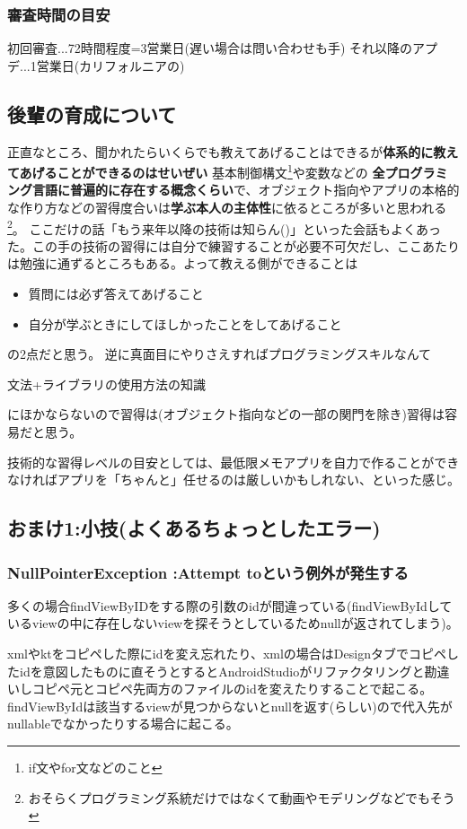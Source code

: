 \documentclass[dvipdfmx,jb5]{jarticle}
\begin{document}
\subsubsection{審査時間の目安}
初回審査...72時間程度=3営業日(遅い場合は問い合わせも手)
それ以降のアプデ...1営業日(カリフォルニアの)
\subsection{後輩の育成について}
正直なところ、聞かれたらいくらでも教えてあげることはできるが\textbf{\gtfamily 体系的に教えてあげることができるのはせいぜい} 基本制御構文\footnote{if文やfor文などのこと}や変数などの
\textbf{\gtfamily 全プログラミング言語に普遍的に存在する概念くらい}で、オブジェクト指向やアプリの本格的な作り方などの習得度合いは\textbf{\gtfamily 学ぶ本人の主体性}に依るところが多いと思われる\footnote{おそらくプログラミング系統だけではなくて動画やモデリングなどでもそう}。
ここだけの話「もう来年以降の技術は知らん()」といった会話もよくあった。この手の技術の習得には自分で練習することが必要不可欠だし、ここあたりは勉強に通ずるところもある。よって教える側ができることは
 \begin{itemize}
 \item 質問には必ず答えてあげること
 \item 自分が学ぶときにしてほしかったことをしてあげること
 \end{itemize}
の2点だと思う。
逆に真面目にやりさえすればプログラミングスキルなんて\par
文法+ライブラリの使用方法の知識\par
にほかならないので習得は(オブジェクト指向などの一部の関門を除き)習得は容易だと思う。\par
技術的な習得レベルの目安としては、最低限メモアプリを自力で作ることができなければアプリを「ちゃんと」任せるのは厳しいかもしれない、といった感じ。
 \subsection{おまけ1:小技(よくあるちょっとしたエラー)}
 \subsubsection{NullPointerException :Attempt toという例外が発生する}
 多くの場合findViewByIDをする際の引数のidが間違っている(findViewByIdしているviewの中に存在しないviewを探そうとしているためnullが返されてしまう)。\par
xmlやktをコピペした際にidを変え忘れたり、xmlの場合はDesignタブでコピペしたidを意図したものに直そうとするとAndroidStudioがリファクタリングと勘違いしコピペ元とコピペ先両方のファイルのidを変えたりすることで起こる。findViewByIdは該当するviewが見つからないとnullを返す(らしい)ので代入先がnullableでなかったりする場合に起こる。
\end{document}
